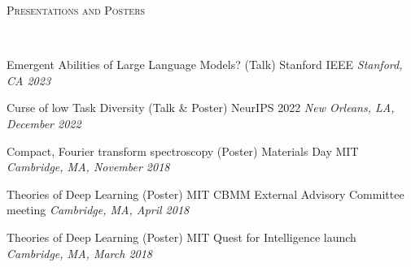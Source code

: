 \documentclass{article}
\newenvironment{changemargin}[2]{%
  \begin{list}{}{%
    \setlength{\topsep}{0pt}%
    \setlength{\leftmargin}{#1}%
    \setlength{\rightmargin}{#2}%
    \setlength{\listparindent}{\parindent}%
    \setlength{\itemindent}{\parindent}%
    \setlength{\parsep}{\parskip}%
  }%
  \item[]}{\end{list}
}
\newcommand{\lineover}{
	\begin{changemargin}{-0.05in}{-0.05in}
		\vspace*{-8pt}
		\hrulefill \\
		\vspace*{-2pt}
	\end{changemargin}
}
\newcommand{\header}[1]{
	\begin{changemargin}{-0.5in}{-0.5in}
		\scshape{#1}\\
  	\lineover
	\end{changemargin}
}
\newenvironment{body} {
	\vspace*{-16pt}
	\begin{changemargin}{-0.25in}{-0.5in}
  }	
	{\end{changemargin}
}
\begin{document}

\header{Presentations and Posters}

\begin{body}



	
    \vspace{15 pt}

    Emergent Abilities of Large Language Models? (Talk)
    \hfill
    Stanford IEEE
	\hfill %
	\emph{Stanford, CA 2023}\\
	\vspace*{-3pt}
    
    Curse of low Task Diversity (Talk \& Poster)
    \hfill
    NeurIPS 2022
	\hfill %
	\emph{New Orleans, LA, December 2022}\\
	\vspace*{-3pt}

    \vspace{5 pt}
    Compact, Fourier transform spectroscopy (Poster)
    \hfill
    Materials Day MIT
	\hfill %
	\emph{Cambridge, MA, November 2018}\\
	\vspace*{-3pt}
    
    \vspace{5 pt}
    Theories of Deep Learning (Poster)
    \hfill
    MIT CBMM External Advisory Committee meeting
	\hfill %
	\emph{Cambridge, MA, April 2018}\\
	\vspace*{-3pt}
	
	\vspace{5 pt}
    Theories of Deep Learning (Poster)
    \hfill
    MIT Quest for Intelligence launch
	\hfill %
	\emph{Cambridge, MA, March 2018}\\
	\vspace*{-3pt}
	

\end{body}
\end{document}
